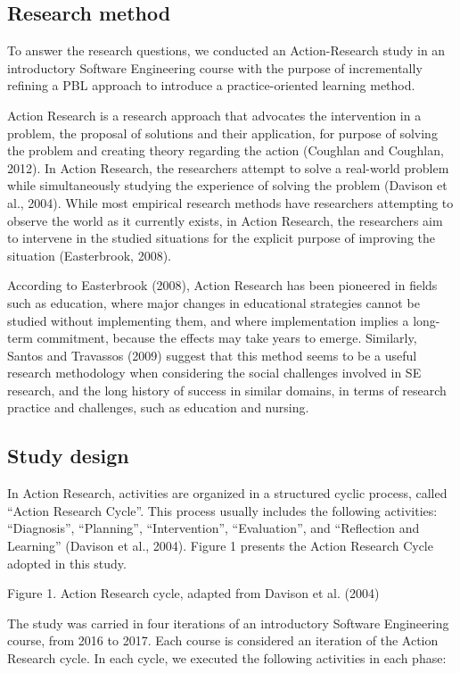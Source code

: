 \subsection{Research method}

To answer the research questions, we conducted an Action-Research study in an introductory Software Engineering course with the purpose of incrementally refining a PBL approach to introduce a practice-oriented learning method.

Action Research is a research approach that advocates the intervention in a problem, the proposal of solutions and their application, for purpose of solving the problem and creating theory regarding the action (Coughlan and Coughlan, 2012). In Action Research, the researchers attempt to solve a real-world problem while simultaneously studying the experience of solving the problem (Davison et al., 2004). While most empirical research methods have researchers attempting to observe the world as it currently exists, in Action Research, the researchers aim to intervene in the studied situations for the explicit purpose of improving the situation (Easterbrook, 2008). 

According to Easterbrook (2008), Action Research has been pioneered in fields such as education, where major changes in educational strategies cannot be studied without implementing them, and where implementation implies a long-term commitment, because the effects may take years to emerge. Similarly, Santos and Travassos (2009) suggest that this method seems to be a useful research methodology when considering the social challenges involved in SE research, and the long history of success in similar domains, in terms of research practice and challenges, such as education and nursing.

\subsection{Study design}

In Action Research, activities are organized in a structured cyclic process, called “Action Research Cycle”.  This process usually includes the following activities: “Diagnosis”, “Planning”, “Intervention”, “Evaluation”, and “Reflection and Learning” (Davison et al., 2004). Figure 1 presents the Action Research Cycle adopted in this study. 

Figure 1. Action Research cycle, adapted from Davison et al. (2004)

The study was carried in four iterations of an introductory Software Engineering course, from 2016 to 2017. Each course is considered an iteration of the Action Research cycle. In each cycle, we executed the following activities in each phase:

